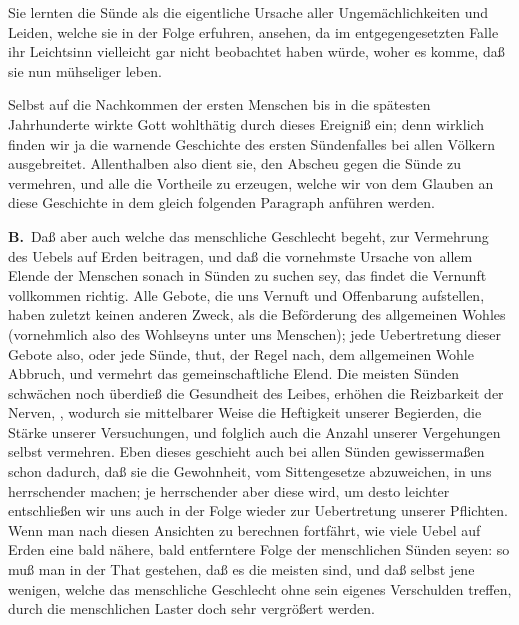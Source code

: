 \begin{aufza}
\begin{aufzb}
\item Sie lernten die Sünde als die eigentliche Ursache aller Ungemächlichkeiten und Leiden, welche sie in der Folge erfuhren, ansehen, da im entgegengesetzten Falle ihr Leichtsinn vielleicht gar nicht beobachtet haben würde, woher es komme, daß sie nun mühseliger leben.
\item Selbst auf die Nachkommen der ersten Menschen bis in die spätesten Jahrhunderte wirkte Gott wohlthätig durch dieses Ereigniß ein; denn wirklich finden wir ja die warnende Geschichte des ersten Sündenfalles bei allen Völkern ausgebreitet. Allenthalben also dient sie, den Abscheu gegen die Sünde zu vermehren, und alle die Vortheile zu erzeugen, welche wir von dem Glauben an diese Geschichte in dem gleich folgenden Paragraph anführen werden.
\end{aufzb}
\end{aufza}\par

\vabst \textbf{B.}~Daß aber auch  welche das menschliche Geschlecht begeht, zur Vermehrung des Uebels auf Erden beitragen, und daß die vornehmste Ursache von allem Elende der Menschen sonach in  Sünden zu suchen sey, das findet die Vernunft vollkommen richtig. Alle Gebote, die uns Vernuft und Offenbarung aufstellen, haben zuletzt keinen anderen Zweck, als die Beförderung des allgemeinen Wohles (vornehmlich also des Wohlseyns unter uns Menschen); jede Uebertretung dieser Gebote also, oder jede Sünde, thut, der Regel nach, dem allgemeinen Wohle Abbruch, und vermehrt das gemeinschaftliche Elend. Die meisten Sünden schwächen noch überdieß die Gesundheit des Leibes, erhöhen die Reizbarkeit der Nerven, \usw , wodurch sie mittelbarer Weise die Heftigkeit unserer Begierden, die Stärke unserer Versuchungen, und folglich auch die Anzahl unserer Vergehungen selbst vermehren. Eben dieses geschieht auch bei allen Sünden gewissermaßen schon dadurch, daß sie die Gewohnheit, vom Sittengesetze abzuweichen, in uns herrschender machen; je herrschender aber diese wird, um desto leichter entschließen wir uns auch in der Folge wieder zur Uebertretung unserer Pflichten. Wenn man nach diesen Ansichten zu berechnen fortfährt, wie viele Uebel auf Erden eine bald nähere, bald entferntere Folge der menschlichen Sünden seyen: so muß man in der That gestehen, daß es die meisten sind, und daß selbst jene wenigen, welche das menschliche Geschlecht ohne sein eigenes Verschulden treffen, durch die menschlichen Laster doch sehr vergrößert werden.\par

